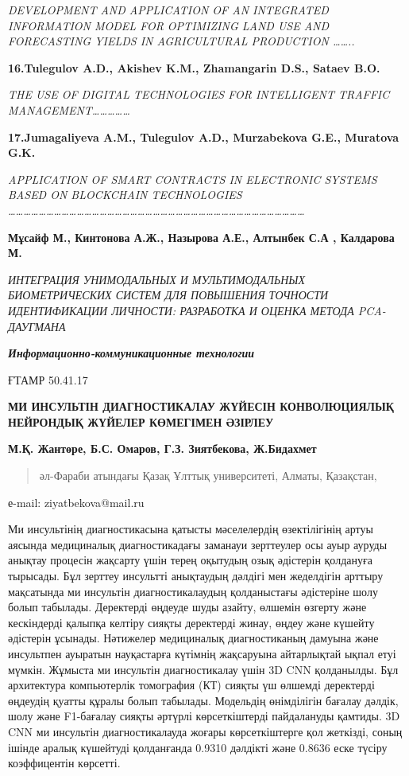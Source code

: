 \emph{DEVELOPMENT AND APPLICATION OF AN INTEGRATED INFORMATION MODEL FOR
OPTIMIZING LAND USE AND FORECASTING YIELDS IN AGRICULTURAL PRODUCTION
\ldots\ldots..}

\textbf{16.Tulegulov A.D., Akishev K.M., Zhamangarin D.S., Sataev B.O.}

\emph{THE USE OF DIGITAL TECHNOLOGIES FOR INTELLIGENT TRAFFIC
MANAGEMENT\ldots\ldots\ldots\ldots\ldots{}}

\textbf{17.Jumagaliyeva A.M., Tulegulov A.D., Murzabekova G.E., Muratova
G.K.}

\emph{APPLICATION OF SMART CONTRACTS IN ELECTRONIC SYSTEMS BASED ON
BLOCKCHAIN TECHNOLOGIES
\ldots\ldots\ldots\ldots\ldots\ldots\ldots\ldots\ldots\ldots\ldots\ldots\ldots\ldots\ldots\ldots\ldots\ldots\ldots\ldots\ldots\ldots\ldots\ldots\ldots\ldots\ldots\ldots\ldots\ldots\ldots\ldots\ldots\ldots\ldots\ldots\ldots\ldots\ldots{}}

\textbf{Мұсайф М., Кинтонова А.Ж., Назырова А.Е., Алтынбек С.А ,
Калдарова М.}

\emph{ИНТЕГРАЦИЯ УНИМОДАЛЬНЫХ И МУЛЬТИМОДАЛЬНЫХ БИОМЕТРИЧЕСКИХ СИСТЕМ
ДЛЯ ПОВЫШЕНИЯ ТОЧНОСТИ ИДЕНТИФИКАЦИИ ЛИЧНОСТИ: РАЗРАБОТКА И ОЦЕНКА
МЕТОДА PCA-ДАУГМАНА}

\emph{\textbf{Информационно-коммуникационные технологии}}

ҒТАМР 50.41.17

\textbf{МИ ИНСУЛЬТІН ДИАГНОСТИКАЛАУ ЖҮЙЕСІН КОНВОЛЮЦИЯЛЫҚ НЕЙРОНДЫҚ
ЖҮЙЕЛЕР КӨМЕГІМЕН ӘЗІРЛЕУ}

\textbf{М.Қ. Жантөре, Б.С. Омаров, Г.З. Зиятбекова, Ж.Бидахмет}

\begin{quote}
әл-Фараби атындағы Қазақ Ұлттық университеті, Алматы, Қазақстан,
\end{quote}

е-mail: ziyatbekova@mail.ru

Ми инсультінің диагностикасына қатысты мәселелердің өзектілігінің артуы
аясында медициналық диагностикадағы заманауи зерттеулер осы ауыр ауруды
анықтау процесін жақсарту үшін терең оқытудың озық әдістерін қолдануға
тырысады. Бұл зерттеу инсультті анықтаудың дәлдігі мен жеделдігін
арттыру мақсатында ми инсультін диагностикалаудың қолданыстағы
әдістеріне шолу болып табылады. Деректерді өңдеуде шуды азайту, өлшемін
өзгерту және кескіндерді қалыпқа келтіру сияқты деректерді жинау, өңдеу
және күшейту әдістерін ұсынады. Нәтижелер медициналық диагностиканың
дамуына және инсультпен ауыратын науқастарға күтімнің жақсаруына
айтарлықтай ықпал етуі мүмкін. Жұмыста ми инсультін диагностикалау үшін
3D CNN қолданылды. Бұл архитектура компьютерлік томография (КТ) сияқты
үш өлшемді деректерді өңдеудің қуатты құралы болып табылады. Модельдің
өнімділігін бағалау дәлдік, шолу және F1-бағалау сияқты әртүрлі
көрсеткіштерді пайдалануды қамтиды. 3D CNN ми инсультін диагностикалауда
жоғары көрсеткіштерге қол жеткізді, соның ішінде аралық күшейтуді
қолданғанда 0.9310 дәлдікті және 0.8636 еске түсіру коэффицентін
көрсетті.

